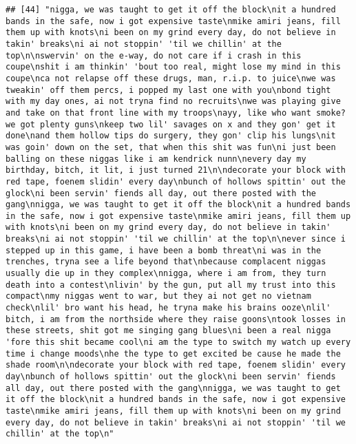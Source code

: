 \documentclass[]{article}
\begin{document}
\begin{verbatim}
## [44] "nigga, we was taught to get it off the block\nit a hundred bands in the safe, now i got expensive taste\nmike amiri jeans, fill them up with knots\ni been on my grind every day, do not believe in takin' breaks\ni ai not stoppin' 'til we chillin' at the top\n\nswervin' on the e-way, do not care if i crash in this coupe\nshit i am thinkin' 'bout too real, might lose my mind in this coupe\nca not relapse off these drugs, man, r.i.p. to juice\nwe was tweakin' off them percs, i popped my last one with you\nbond tight with my day ones, ai not tryna find no recruits\nwe was playing give and take on that front line with my troops\nayy, like who want smoke? we got plenty guns\nkeep two lil' savages on x and they gon' get it done\nand them hollow tips do surgery, they gon' clip his lungs\nit was goin' down on the set, that when this shit was fun\ni just been balling on these niggas like i am kendrick nunn\nevery day my birthday, bitch, it lit, i just turned 21\n\ndecorate your block with red tape, foenem slidin' every day\nbunch of hollows spittin' out the glock\ni been servin' fiends all day, out there posted with the gang\nnigga, we was taught to get it off the block\nit a hundred bands in the safe, now i got expensive taste\nmike amiri jeans, fill them up with knots\ni been on my grind every day, do not believe in takin' breaks\ni ai not stoppin' 'til we chillin' at the top\n\never since i stepped up in this game, i have been a bomb threat\ni was in the trenches, tryna see a life beyond that\nbecause complacent niggas usually die up in they complex\nnigga, where i am from, they turn death into a contest\nlivin' by the gun, put all my trust into this compact\nmy niggas went to war, but they ai not get no vietnam check\nlil' bro want his head, he tryna make his brains ooze\nlil' bitch, i am from the northside where they raise goons\ntook losses in these streets, shit got me singing gang blues\ni been a real nigga 'fore this shit became cool\ni am the type to switch my watch up every time i change moods\nhe the type to get excited be cause he made the shade room\n\ndecorate your block with red tape, foenem slidin' every day\nbunch of hollows spittin' out the glock\ni been servin' fiends all day, out there posted with the gang\nnigga, we was taught to get it off the block\nit a hundred bands in the safe, now i got expensive taste\nmike amiri jeans, fill them up with knots\ni been on my grind every day, do not believe in takin' breaks\ni ai not stoppin' 'til we chillin' at the top\n"                                                                                                                                                                                                                                                                                                                                                                                                                                                                                                                                                                                                                                                                                                                                                                                                                          
\end{verbatim}
\end{document}
